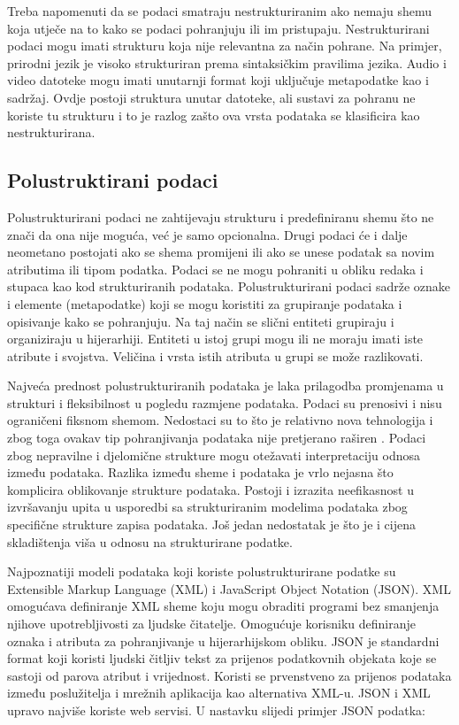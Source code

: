 \documentclass{foi}
\begin{document}
Treba napomenuti da se podaci smatraju nestrukturiranim ako nemaju shemu koja utječe na to kako se podaci pohranjuju ili im pristupaju. Nestrukturirani podaci mogu imati strukturu koja nije relevantna za način pohrane. Na primjer, prirodni jezik je visoko strukturiran prema sintaksičkim pravilima jezika. Audio i video datoteke mogu imati unutarnji format koji uključuje metapodatke kao i sadržaj. Ovdje postoji struktura unutar datoteke, ali sustavi za pohranu ne koriste tu strukturu i to je razlog zašto ova vrsta podataka se klasificira kao nestrukturirana. \cite{dataEngineerStudyGuide} 

\subsection{Polustruktirani podaci}

Polustrukturirani podaci ne zahtijevaju strukturu i predefiniranu shemu što ne znači da ona nije moguća, već je samo opcionalna. Drugi podaci će i dalje neometano postojati ako se shema promijeni ili ako se unese podatak sa novim atributima ili tipom podatka. Podaci se ne mogu pohraniti u obliku redaka i stupaca kao kod strukturiranih podataka. Polustrukturirani podaci sadrže oznake i elemente (metapodatke) koji se mogu koristiti za grupiranje podataka i opisivanje kako se pohranjuju. Na taj način se slični entiteti grupiraju i organiziraju u hijerarhiji. Entiteti u istoj grupi mogu ili ne moraju imati iste atribute i svojstva. Veličina i vrsta istih atributa u grupi se može razlikovati.

Najveća prednost polustrukturiranih podataka je laka prilagodba promjenama u strukturi i fleksibilnost u pogledu razmjene podataka. Podaci su prenosivi i nisu ograničeni fiksnom shemom. Nedostaci su to što je relativno nova tehnologija i zbog toga ovakav tip pohranjivanja podataka nije pretjerano raširen \cite{unstructuredStructuredSemiStructured}. Podaci zbog nepravilne i djelomične strukture mogu otežavati interpretaciju odnosa između podataka. Razlika između sheme i podataka je vrlo nejasna što komplicira oblikovanje strukture podataka. Postoji i izrazita neefikasnost u izvršavanju upita u usporedbi sa strukturiranim modelima podataka zbog specifične strukture zapisa podataka. Još jedan nedostatak je što je i cijena skladištenja viša u odnosu na strukturirane podatke. \cite{tbpknjiga}

Najpoznatiji modeli podataka koji koriste polustrukturirane podatke su Extensible Markup Language (XML) i JavaScript Object Notation (JSON). XML omogućava definiranje XML sheme koju mogu obraditi programi bez smanjenja njihove upotrebljivosti za ljudske čitatelje. Omogućuje korisniku definiranje oznaka i atributa za pohranjivanje u hijerarhijskom obliku. JSON je standardni format koji koristi ljudski čitljiv tekst za prijenos podatkovnih objekata koje se sastoji od parova atribut i vrijednost. Koristi se prvenstveno za prijenos podataka između poslužitelja i mrežnih aplikacija kao alternativa XML-u. JSON i XML upravo najviše koriste web servisi. \cite{cros} U nastavku slijedi primjer JSON podatka:
\end{document}

